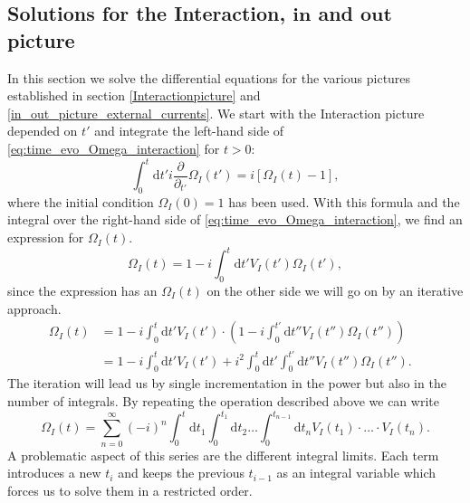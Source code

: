 \documentclass[12pt, titlepage]{article}
\begin{document}
\subsection{Solutions for the Interaction, $ \pmb{in} $  and $ \pmb{out} $ picture}\label{solutions_interaction_in_out}
In this section we solve the differential equations for the various pictures established in section \ref{Interactionpicture} and \ref{in_out_picture_external_currents}.
We start with the Interaction picture depended on $ t' $  and integrate the left-hand side of \eqref{eq:time_evo_Omega_interaction} for $ t>0 $:
\begin{equation}
\int_{0}^{t}\mathrm{d}t'
 i 
 \frac{\partial}{\partial_{t'}} 
 \Omega_{I} (t')
 =
 i
 \left[ 
\Omega_{I}(t) -1
 \right] 
 ,
\end{equation}
where the initial condition $ \Omega_{I}(0)=1 $ has been used.
With this formula and the integral over the right-hand side of \eqref{eq:time_evo_Omega_interaction}, we find an expression for $ \Omega_{I}(t) $.
\begin{equation}
\Omega_{I}(t)=
1
-
i
\int_{0}^{t}\mathrm{d}t'V_{I}(t')\Omega_{I}(t')	,
\end{equation}
since the expression has an $ \Omega_{I}(t) $ on the other side we will go on by an iterative approach.
\begin{subequations}
\begin{align}
\Omega_{I}(t)
&=
1
-
i 
\int_{0}^{t}\mathrm{d}t'V_{I}(t')
\cdot
\left( 
1
-
i
\int_{0}^{t'}\mathrm{d}t''V_{I}(t'')\Omega_{I}(t'')
\right) 
&\\
&=
1
-
i
\int_{0}^{t}\mathrm{d}t'V_{I}(t')
+i^{2} 
\int_{0}^{t}\mathrm{d}t'
\int_{0}^{t'}\mathrm{d}t''
V_{I}(t'')\Omega_{I}(t'').
\end{align}
\end{subequations}
The iteration will lead us by single incrementation in the power but also in the number of integrals. By repeating the operation described above we can write
\begin{equation}\label{Omega_different_t}
\Omega_{I}(t) =
\sum\limits_{n=0}^{\infty} 
(-i)^{n}
\int_{0}^{t}\mathrm{d}t_1\int_{0}^{t_{1}}\! \! \mathrm{d}t_2
 \ldots
 \int_{0}^{t_{n-1}}\! \! \mathrm{d}t_n
  V_{I}(t_1)\cdot \ldots \cdot V_{I}(t_n)
  .
\end{equation}
A problematic aspect of this series are the different integral limits. Each term introduces a new $ t_{i} $ and keeps the previous $ t_{i-1} $ as an integral variable which forces us to solve them in a restricted order. 
\end{document}
